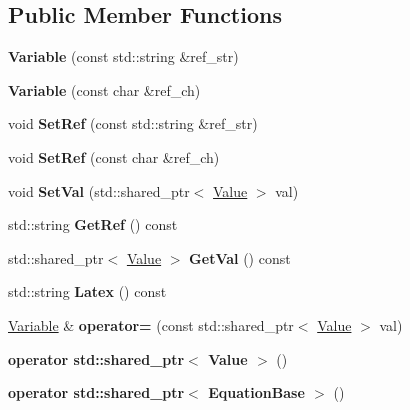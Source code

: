 \subsection*{Public Member Functions}
\begin{DoxyCompactItemize}
\item 
\mbox{\label{classradix_1_1Variable_afda152d664203a2e660dcec4e7f4f6ee}} 
{\bfseries Variable} (const std\+::string \&ref\+\_\+str)
\item 
\mbox{\label{classradix_1_1Variable_ad74660a33f619558be499c0c87d71e73}} 
{\bfseries Variable} (const char \&ref\+\_\+ch)
\item 
\mbox{\label{classradix_1_1Variable_aac2a333d710dae5a8a1499019e6b0541}} 
void {\bfseries Set\+Ref} (const std\+::string \&ref\+\_\+str)
\item 
\mbox{\label{classradix_1_1Variable_aa56b21d16749be50b78eea83b77d1700}} 
void {\bfseries Set\+Ref} (const char \&ref\+\_\+ch)
\item 
\mbox{\label{classradix_1_1Variable_a072e338af8cc3833a18a8648de46c7c7}} 
void {\bfseries Set\+Val} (std\+::shared\+\_\+ptr$<$ \hyperlink{classradix_1_1Value}{Value} $>$ val)
\item 
\mbox{\label{classradix_1_1Variable_a66ba56c31e8d4bc795f83e13c236c5ba}} 
std\+::string {\bfseries Get\+Ref} () const
\item 
\mbox{\label{classradix_1_1Variable_a2f282cab8f47b1fac30df8f7df3f8acd}} 
std\+::shared\+\_\+ptr$<$ \hyperlink{classradix_1_1Value}{Value} $>$ {\bfseries Get\+Val} () const
\item 
\mbox{\label{classradix_1_1Variable_a336d28b81443a656d72c713f4fa73c63}} 
std\+::string {\bfseries Latex} () const
\item 
\mbox{\label{classradix_1_1Variable_a46f38d8ae307f2e7846b76f15b727201}} 
\hyperlink{classradix_1_1Variable}{Variable} \& {\bfseries operator=} (const std\+::shared\+\_\+ptr$<$ \hyperlink{classradix_1_1Value}{Value} $>$ val)
\item 
\mbox{\label{classradix_1_1Variable_aa13e5f5df26da89d3b8984061ca38bd8}} 
{\bfseries operator std\+::shared\+\_\+ptr$<$ Value $>$} ()
\item 
\mbox{\label{classradix_1_1Variable_afcb88f325eaf93a53c6c55186e823925}} 
{\bfseries operator std\+::shared\+\_\+ptr$<$ Equation\+Base $>$} ()
\end{DoxyCompactItemize}
